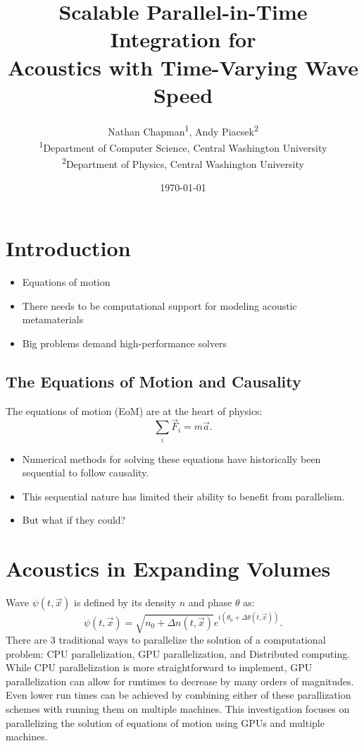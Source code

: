\title{Scalable Parallel-in-Time Integration for \\ \Large{Acoustics with Time-Varying Wave Speed}}
\author{
    Nathan Chapman\textsuperscript{1}, Andy Piacsek\textsuperscript{2} \\
    \textsuperscript{1}Department of Computer Science, Central Washington University \\
    \textsuperscript{2}Department of Physics, Central Washington University
}
\date{\today}

\maketitle

\section*{Introduction}
	\begin{itemize}
		\item Equations of motion
		\item There needs to be computational support for modeling acoustic metamaterials
		\item Big problems demand high-performance solvers
	\end{itemize}

\subsection*{The Equations of Motion and Causality}
The equations of motion (EoM) are at the heart of physics:
\[
\sum_i \vec{F}_i = m\vec{a}.
\]

\begin{itemize}
	\item Numerical methods for solving these equations have historically been sequential to follow causality.
	\item This sequential nature has limited their ability to benefit from parallelism. 
	\item But what if they could?
\end{itemize}

\section*{Acoustics in Expanding Volumes}
Wave $\psi(t, \vec{x})$ is defined by its density $n$ and phase $\theta$ as:
\[
\psi(t, \vec{x}) = \sqrt{n_0 + \Delta n(t, \vec{x})} e^{i(\theta_0 + \Delta \theta(t, \vec{x}))}.
\]
	There are 3 traditional ways to parallelize the solution of a computational problem: 
	CPU parallelization, 
	GPU parallelization, 
	and Distributed computing.  
	While CPU parallelization is more straightforward to implement, GPU parallelization can allow for runtimes to decrease by many orders of magnitudes.
	Even lower run times can be achieved by combining either of these parallization schemes with running them on multiple machines.  This investigation focuses on parallelizing the solution of equations of motion using GPUs and multiple machines.


